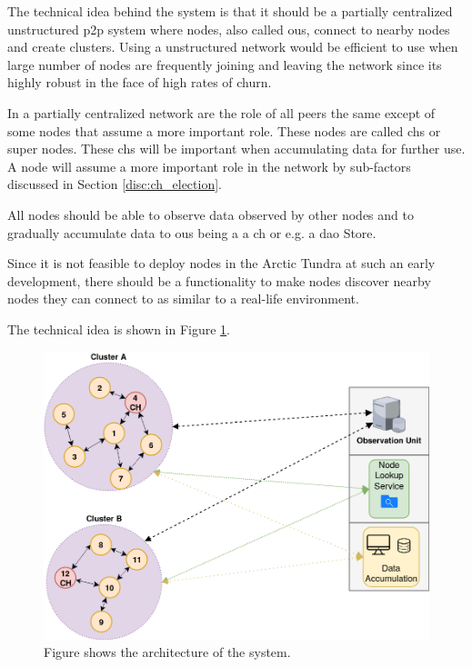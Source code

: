 \documentclass[USenglish]{uit-thesis}
\begin{document}

The technical idea behind the system is that it should be a partially centralized unstructured \gls{p2p} system where nodes, also called \gls{ou}s, connect to nearby nodes and create clusters. Using a unstructured network would be efficient to use when large number of nodes are frequently joining and leaving the network since its highly robust in the face of high rates of churn.

In a partially centralized network are the role of all peers the same except of some nodes that assume a more important role. These nodes are called \gls{ch}s or super nodes. These \gls{ch}s will be important when accumulating data for further use. A node will assume a more important role in the network by sub-factors discussed in Section \ref{disc:ch_election}.

All nodes should be able to observe data observed by other nodes and to gradually accumulate data to \gls{ou}s being a a \gls{ch} or e.g. a \gls{dao} Store.

Since it is not feasible to deploy nodes in the Arctic Tundra at such an early development, there should be a functionality to make nodes discover nearby nodes they can connect to as similar to a real-life environment.

The technical idea is shown in Figure \ref{fig:idea}.

\begin{figure}
\centering
\includegraphics[width=\textwidth]{idea.png}
\caption{Figure shows the architecture of the system.}
\label{fig:idea}
\end{figure}
\end{document}
